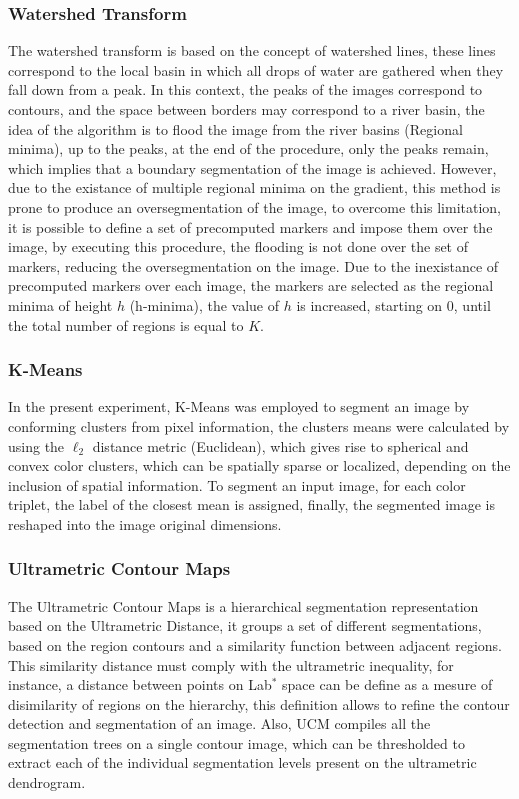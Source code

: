 \documentclass[10pt,twocolumn,letterpaper]{article}
\begin{document}
\subsubsection*{Watershed Transform}
The watershed transform is based on the concept of watershed lines, these lines correspond to the local basin in which all drops of water are gathered when they fall down from a peak. In this context, the peaks of the images correspond to contours, and the space between borders may correspond to a river basin, the idea of the algorithm is to flood the image from the river basins (Regional minima), up to the peaks, at the end of the procedure, only the peaks remain, which implies that a boundary segmentation of the image is achieved. However, due to the existance of multiple regional minima on the gradient, this method is prone to produce an oversegmentation of the image, to overcome this limitation, it is possible to define a set of precomputed markers and impose them over the image, by executing this procedure, the flooding is not done over the set of markers, reducing the oversegmentation on the image. Due to the inexistance of precomputed markers over each image, the markers are selected as the regional minima of height $h$ (h-minima), the value of $h$ is increased, starting on 0, until the total number of regions is equal to $K$.

\subsubsection*{K-Means}
In the present experiment, K-Means was employed to segment an image by conforming clusters from pixel information, the clusters means were calculated by using the $\ell_2$ distance metric (Euclidean), which gives rise to spherical and convex color clusters, which can be spatially sparse or localized, depending on the inclusion of spatial information. To segment an input image, for each color triplet, the label of the closest mean is assigned, finally, the segmented image is reshaped into the image original dimensions.
 

\subsubsection*{Ultrametric Contour Maps}
The Ultrametric Contour Maps is a hierarchical segmentation representation based on the Ultrametric Distance, it groups a set of different segmentations, based on the region contours and a similarity function between adjacent regions. This similarity distance must comply with the ultrametric inequality, for instance, a distance between points on Lab$^{*}$ space can be define as a mesure of disimilarity of regions on the hierarchy, this definition allows to refine the contour detection and segmentation of an image. Also, UCM compiles all the segmentation trees on a single contour image, which can be thresholded to extract each of the individual segmentation levels present on the ultrametric dendrogram.
\end{document}
